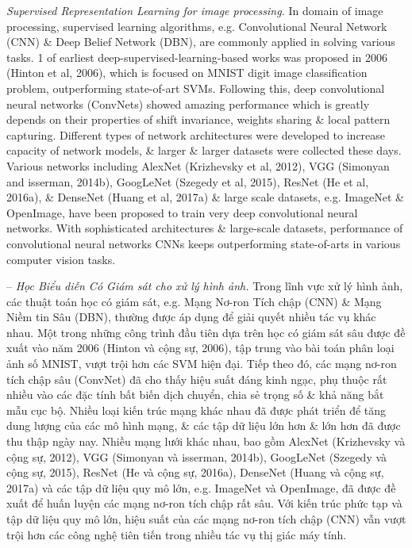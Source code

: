 \documentclass{article}
\begin{document}
\begin{itemize}
\begin{itemize}
\begin{itemize}
            {\it Supervised Representation Learning for image processing.} In domain of image processing, supervised learning algorithms, e.g. Convolutional Neural Network (CNN) \& Deep Belief Network (DBN), are commonly applied in solving various tasks. 1 of earliest deep-supervised-learning-based works was proposed in 2006 (Hinton et al, 2006), which is focused on MNIST digit image classification problem, outperforming state-of-art SVMs. Following this, deep convolutional neural networks (ConvNets) showed amazing performance which is greatly depends on their properties of shift invariance, weights sharing \& local pattern capturing. Different types of network architectures were developed to increase capacity of network models, \& larger \& larger datasets were collected these days. Various networks including AlexNet (Krizhevsky et al, 2012), VGG (Simonyan and isserman, 2014b), GoogLeNet (Szegedy et al, 2015), ResNet (He et al, 2016a), \& DenseNet (Huang et al, 2017a) \& large scale datasets, e.g. ImageNet \& OpenImage, have been proposed to train very deep convolutional neural networks. With sophisticated architectures \& large-scale datasets, performance of convolutional neural networks CNNs keeps outperforming state-of-arts in various computer vision tasks.

            -- {\it Học Biểu diễn Có Giám sát cho xử lý hình ảnh.} Trong lĩnh vực xử lý hình ảnh, các thuật toán học có giám sát, e.g. Mạng Nơ-ron Tích chập (CNN) \& Mạng Niềm tin Sâu (DBN), thường được áp dụng để giải quyết nhiều tác vụ khác nhau. Một trong những công trình đầu tiên dựa trên học có giám sát sâu được đề xuất vào năm 2006 (Hinton và cộng sự, 2006), tập trung vào bài toán phân loại ảnh số MNIST, vượt trội hơn các SVM hiện đại. Tiếp theo đó, các mạng nơ-ron tích chập sâu (ConvNet) đã cho thấy hiệu suất đáng kinh ngạc, phụ thuộc rất nhiều vào các đặc tính bất biến dịch chuyển, chia sẻ trọng số \& khả năng bắt mẫu cục bộ. Nhiều loại kiến trúc mạng khác nhau đã được phát triển để tăng dung lượng của các mô hình mạng, \& các tập dữ liệu lớn hơn \& lớn hơn đã được thu thập ngày nay. Nhiều mạng lưới khác nhau, bao gồm AlexNet (Krizhevsky và cộng sự, 2012), VGG (Simonyan và isserman, 2014b), GoogLeNet (Szegedy và cộng sự, 2015), ResNet (He và cộng sự, 2016a), DenseNet (Huang và cộng sự, 2017a) và các tập dữ liệu quy mô lớn, e.g. ImageNet và OpenImage, đã được đề xuất để huấn luyện các mạng nơ-ron tích chập rất sâu. Với kiến trúc phức tạp và tập dữ liệu quy mô lớn, hiệu suất của các mạng nơ-ron tích chập (CNN) vẫn vượt trội hơn các công nghệ tiên tiến trong nhiều tác vụ thị giác máy tính.


\end{itemize}
\end{itemize}
\end{itemize}
\end{document}
